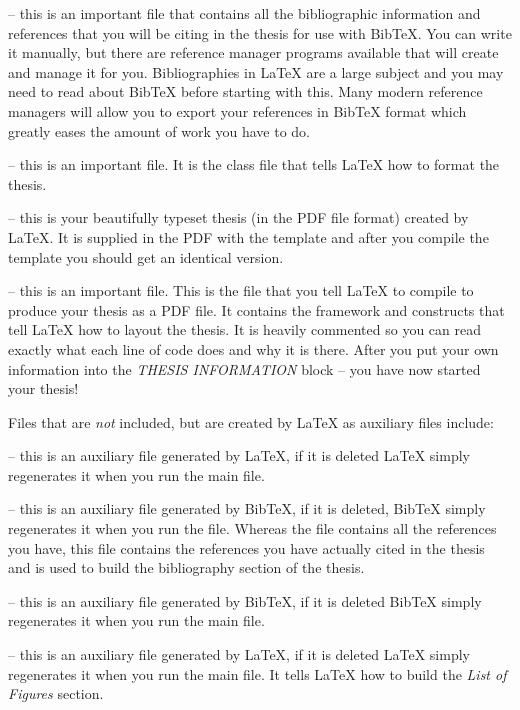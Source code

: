  -- this is an important file that contains all the bibliographic information and references that you will be citing in the thesis for use with BibTeX. You can write it manually, but there are reference manager programs available that will create and manage it for you. Bibliographies in \LaTeX{} are a large subject and you may need to read about BibTeX before starting with this. Many modern reference managers will allow you to export your references in BibTeX format which greatly eases the amount of work you have to do.

 -- this is an important file. It is the class file that tells \LaTeX{} how to format the thesis. 

 -- this is your beautifully typeset thesis (in the PDF file format) created by \LaTeX{}. It is supplied in the PDF with the template and after you compile the template you should get an identical version.

 -- this is an important file. This is the file that you tell \LaTeX{} to compile to produce your thesis as a PDF file. It contains the framework and constructs that tell \LaTeX{} how to layout the thesis. It is heavily commented so you can read exactly what each line of code does and why it is there. After you put your own information into the \emph{THESIS INFORMATION} block -- you have now started your thesis!

Files that are \emph{not} included, but are created by \LaTeX{} as auxiliary files include:

 -- this is an auxiliary file generated by \LaTeX{}, if it is deleted \LaTeX{} simply regenerates it when you run the main  file.

 -- this is an auxiliary file generated by BibTeX, if it is deleted, BibTeX simply regenerates it when you run the  file. Whereas the  file contains all the references you have, this  file contains the references you have actually cited in the thesis and is used to build the bibliography section of the thesis.

 -- this is an auxiliary file generated by BibTeX, if it is deleted BibTeX simply regenerates it when you run the main  file.

 -- this is an auxiliary file generated by \LaTeX{}, if it is deleted \LaTeX{} simply regenerates it when you run the main  file. It tells \LaTeX{} how to build the \emph{List of Figures} section.

